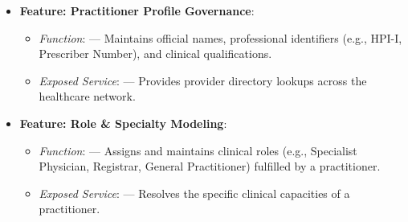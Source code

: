 \begin{itemize}
\begin{itemize}
\begin{itemize}
\item 
\emph{Function}: \texttt{} — Validates national registration, specialty endorsements, and disciplinary sanctions against regulatory registries (e.g., AHPRA).



\item 
\emph{Exposed Service}: \texttt{} — Discloses verified registration and status to credentialing and clinical systems.



\item 
\emph{Governed Process}: \textbf{Practitioner Verification Process}.



\end{itemize}


\item 
\textbf{Feature: Practitioner Profile Governance}:


\begin{itemize}

\item 
\emph{Function}: \texttt{} — Maintains official names, professional identifiers (e.g., HPI-I, Prescriber Number), and clinical qualifications.



\item 
\emph{Exposed Service}: \texttt{} — Provides provider directory lookups across the healthcare network.



\end{itemize}


\item 
\textbf{Feature: Role \& Specialty Modeling}:


\begin{itemize}

\item 
\emph{Function}: \texttt{} — Assigns and maintains clinical roles (e.g., Specialist Physician, Registrar, General Practitioner) fulfilled by a practitioner.



\item 
\emph{Exposed Service}: \texttt{} — Resolves the specific clinical capacities of a practitioner.




\end{itemize}
\end{itemize}
\end{itemize}
